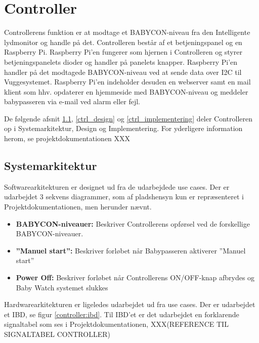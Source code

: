 \chapter{Controller}

Controllerens funktion er at modtage et BABYCON-niveau fra den Intelligente lydmonitor og handle på det. Controlleren består af et betjeningspanel og en Raspberry Pi. Raspberry Pi'en fungerer som hjernen i Controlleren og styrer betjeningspanelets dioder og handler på panelets knapper. Raspberry Pi'en handler på det modtagede BABYCON-niveau ved at sende data over I2C til Vuggesystemet. Raspberry Pi'en indeholder desuden en webserver samt en mail klient som hhv. opdaterer en hjemmeside med BABYCON-niveau og meddeler babypasseren via e-mail ved alarm eller fejl.

De følgende afsnit \ref{ctrl_sysark},   \ref{ctrl_design} og \ref{ctrl_implementering} deler Controlleren op i Systemarkitektur, Design og Implementering. For yderligere information herom, se projektdokumentationen XXX

\section{Systemarkitektur}
\label{ctrl_sysark}

Softwarearkitekturen er designet ud fra de udarbejdede use cases. Der er udarbejdet 3 sekvens diagrammer, som af pladshensyn kun er repræsenteret i Projektdokumentationen, men herunder nævnt. 

\begin{itemize}
\item \textbf{BABYCON-niveauer:} Beskriver Controllerens opførsel ved de forskellige BABYCON-niveauer.
\item \textbf{''Manuel start'':} Beskriver forløbet når Babypasseren aktiverer ''Manuel start''
\item \textbf{Power Off:} Beskriver forløbet når Controllerens ON/OFF-knap afbrydes og Baby Watch systemet slukkes 
\end{itemize}


Hardwarearkitekturen er ligeledes udarbejdet ud fra use cases. Der er udarbejdet et IBD, se figur \ref{controller:ibd}. Til IBD'et er det udarbejdet en forklarende signaltabel som ses i Projektdokumentationen, XXX(REFERENCE TIL SIGNALTABEL CONTROLLER)





